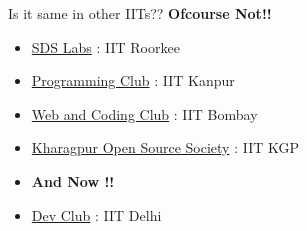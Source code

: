     \begin{frame}{Is it same in other IITs??}
        \uncover<+-> {\textbf {Ofcourse Not!!\\}}
        \begin{itemize}
            \item<+-> \href{https://sdslabs.co}{SDS Labs} : IIT Roorkee
            \item<+-> \href{http://pclub.in/}{Programming Club} : IIT Kanpur            
            \item<+-> \href{http://wncc-iitb.org}{Web and Coding Club} :  IIT Bombay
            \item<+-> \href{http://kossiitkgp.in/}{Kharagpur Open Source Society} :  IIT KGP
            \item<+->[] \textbf{And Now !!}
            \item<+-> \href{http://www.cse.iitd.ernet.in/devclub/}{Dev Club} : IIT Delhi
        \end{itemize}
    \end{frame}
